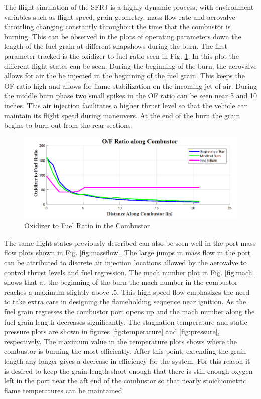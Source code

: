 The flight simulation of the SFRJ is a highly dynamic process, with environment variables such as flight speed, grain geometry, mass flow rate and aerovalve throttling changing constantly throughout the time that the combustor is burning. This can be observed in the plots of operating parameters down the length of the fuel grain at different snapshows during the burn. The first parameter tracked is the oxidizer to fuel ratio seen in Fig. \ref{fig:OF}. In this plot the different flight states can be seen. During the beginning of the burn, the aerovalve allows for air the be injected in the beginning of the fuel grain. This keeps the OF ratio high and allows for flame stabilization on the incoming jet of air. During the middle burn phase two small spikes in the OF ratio can be seen near 5 and 10 inches. This air injection facilitates a higher thrust level so that the vehicle can maintain its flight speed during maneuvers. At the end of the burn the grain begins to burn out from the rear sections.\\ \indent

\begin{figure}[H]
\centering
\includegraphics[width=1\textwidth] {Combustor_Figures/OF.png}
\caption{Oxidizer to Fuel Ratio in the Combustor}
\label{fig:OF}
\end{figure}

The same flight states previously described can also be seen well in the port mass flow plots shown in Fig. \ref{fig:massflow}. The large jumps in mass flow in the port can be attributed to discrete air injection locations allowed by the aerovalve to control thrust levels and fuel regression. The mach number plot in Fig. \ref{fig:mach} shows that at the beginning of the burn the mach number in the combustor reaches a maximum slightly above .5. This high speed flow emphasizes the need to take extra care in designing the flameholding sequence near ignition. As the fuel grain regresses the combustor port opens up and the mach number along the fuel grain length decreases significantly. The stagnation temperature and static pressure plots are shown in figures \ref{fig:temperature} and \ref{fig:pressure}, respectively. The maximum value in the temperature plots shows where the combustor is burning the most efficiently. After this point, extending the grain length any longer gives a decrease in efficiency for the system. For this reason it is desired to keep the grain length short enough that there is still enough oxygen left in the port near the aft end of the combustor so that nearly stoichiometric flame temperatures can be maintained.\\ \indent

